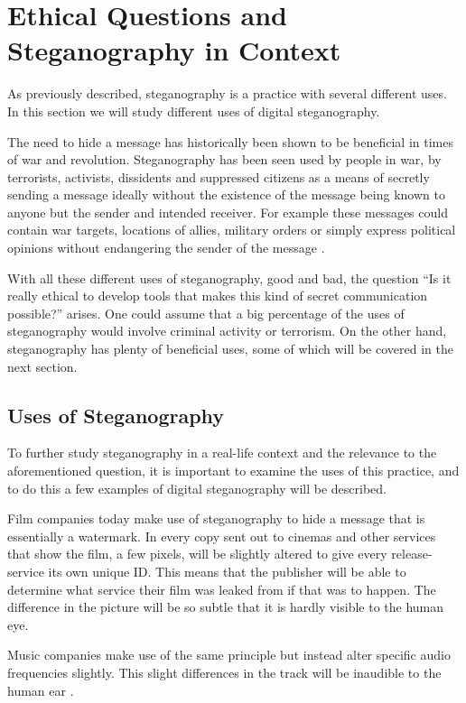 \section{Ethical Questions and Steganography in Context}
As previously described, steganography is a practice with several different uses.
In this section we will study different uses of digital steganography.\vspace*{12pt}

\noindent The need to hide a message has historically been shown to be beneficial in times of war and revolution.
Steganography has been seen used by people in war, by terrorists, activists, dissidents and suppressed citizens as a means of secretly sending a message ideally without the existence of the message being known to anyone but the sender and intended receiver.
For example these messages could contain war targets, locations of allies, military orders or simply express political opinions without endangering the sender of the message \citep{Singh2001}.

With all these different uses of steganography, good and bad, the question ``Is it really ethical to develop tools that makes this kind of secret communication possible?'' arises.
One could assume that a big percentage of the uses of steganography would involve criminal activity or terrorism.
On the other hand, steganography has plenty of beneficial uses, some of which will be covered in the next section.

\subsection{Uses of Steganography}
To further study steganography in a real-life context and the relevance to the aforementioned question, it is important to examine the uses of this practice, and to do this a few examples of digital steganography will be described.

Film companies today make use of steganography to hide a message that is essentially a watermark.
In every copy sent out to cinemas and other services that show the film, a few pixels, will be slightly altered to give every release-service its own unique ID.
This means that the publisher will be able to determine what service their film was leaked from if that was to happen.
The difference in the picture will be so subtle that it is hardly visible to the human eye.

Music companies make use of the same principle but instead alter specific audio frequencies slightly.
This slight differences in the track will be inaudible to the human ear \citep{Anderson1998}.

